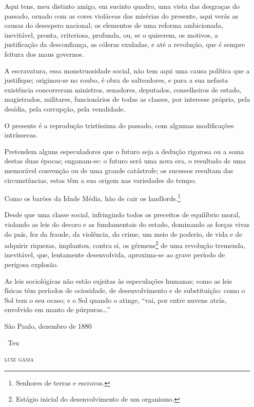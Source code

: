 Aqui tens, meu distinto amigo, em sucinto quadro, uma vista das
desgraças do passado, ornado com as cores violáceas das misérias do
presente, aqui verás as causas do desespero nacional; os elementos de
uma reforma ambicionada, inevitável, pronta, criteriosa, profunda, ou,
se o quiserem, os motivos, a justificação da desconfiança, as cóleras
exuladas, e até a revolução, que é sempre feitura dos maus governos.

A escravatura, essa monstruosidade social, não tem aqui uma causa
política que a justifique; originou-se no roubo, é obra de salteadores,
e para a sua nefasta existência concorreram ministros, senadores,
deputados, conselheiros de estado, magistrados, militares, funcionários
de todas as classes, por interesse próprio, pela desídia, pela
corrupção, pela venalidade.

O presente é a reprodução tristíssima do passado, com algumas
modificações intrínsecas.

Pretendem alguns especuladores que o futuro seja a dedução rigorosa ou a
soma destas duas épocas; enganam-se: o futuro será uma nova era, o
resultado de uma memorável convenção ou de uma grande catástrofe; os
sucessos resultam das circunstâncias, estas têm a sua origem nas
variedades do tempo.

Como os barões da Idade Média, hão de cair os landlords.\footnote{
  Senhores de terras e escravos.}

Desde que uma classe social, infringindo todos os preceitos de
equilíbrio moral, violando as leis do decoro e as fundamentais do
estado, dominando as forças vivas do país, fez da fraude, da violência,
do crime, um meio de poderio, de vida e de adquirir riquezas, implantou,
contra si, os gérmens\footnote{Estágio inicial do desenvolvimento de
  um organismo.} de uma
revolução tremenda, inevitável, que, lentamente desenvolvida,
aproxima-se ao grave período de perigosa explosão.

As leis sociológicas não estão sujeitas às especulações humanas; como as
leis físicas têm períodos de ociosidade, de desenvolvimento e de
substituição: como o Sol tem o seu ocaso; e o Sol quando o atinge, ``vai,
por entre nuvens atrás, envolvido em manto de púrpuras\ldots{}''

\medskip

\hfill São Paulo, dezembro de 1880

\hfill\ Teu

\hfill\textsc{luiz gama}


